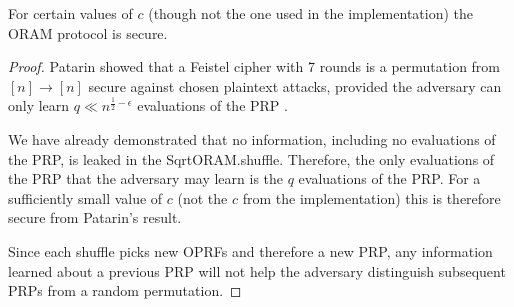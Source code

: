 \begin{theorem}
For certain values of $c$ (though not the one used in the implementation)
the ORAM protocol is secure.
\end{theorem}

\begin{proof}
Patarin showed that a Feistel cipher with 7 rounds is a
permutation from $[n] \rightarrow [n]$ 
secure against chosen plaintext attacks,
provided the adversary can only learn 
$q \ll n^{\frac{1}{2} - \epsilon}$ evaluations of the PRP
\cite{patarin2003luby}.

We have already demonstrated that no information, including no
evaluations of the PRP, is leaked in the SqrtORAM.shuffle.
Therefore, the only evaluations of the PRP that the adversary may
learn is the $q$ evaluations of the PRP.
For a sufficiently small value of $c$ (not the $c$ from the implementation)
this is therefore secure from Patarin's result.

Since each shuffle picks new OPRFs and therefore a new PRP,
any information learned about a previous PRP will not help
the adversary distinguish subsequent PRPs from a random permutation.
\end{proof}

